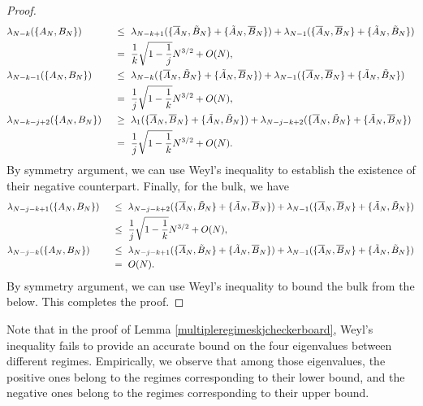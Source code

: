 \documentclass[11pt,reqno]{amsart}
\numberwithin{equation}{section}
\theoremstyle{plain}
\begin{document}
\begin{proof}
\begin{alignat}{2}
&\lambda_{N-k}(\{A_N,B_N\}) &&\ \leq \ \lambda_{N-k+1}(\{\overline{A}_N,\Tilde{B}_N\} + \{\Tilde{A}_N,\overline{B}_N\}) + \lambda_{N-1}(\{\overline{A}_N,\overline{B}_N\}+\{\Tilde{A}_N, \Tilde{B}_N\}) \nonumber \\
& &&\ = \ \frac{1}{k}\sqrt{1-\frac{1}{j}}N^{3/2}+O(N),\nonumber \\
&\lambda_{N-k-1}(\{A_N,B_N\}) &&\ \leq \ \lambda_{N-k}(\{\overline{A}_N,\Tilde{B}_N\} + \{\Tilde{A}_N,\overline{B}_N\}) + \lambda_{N-1}(\{\overline{A}_N,\overline{B}_N\}+\{\Tilde{A}_N, \Tilde{B}_N\}) \nonumber \\
& &&\ = \ \frac{1}{j}\sqrt{1-\frac{1}{k}}N^{3/2}+O(N),\nonumber \\
&\lambda_{N-k-j+2}(\{A_N,B_N\}) &&\ \geq \ \lambda_1(\{\overline{A}_N,\overline{B}_N\}+\{\Tilde{A}_N,\Tilde{B}_N\}) + \lambda_{N-j-k+2}(\{\overline{A}_N,\Tilde{B}_N\} + \{\Tilde{A}_N,\overline{B}_N\}) \nonumber \\
& &&\ = \ \frac{1}{j}\sqrt{1-\frac{1}{k}}N^{3/2} + O(N).
\end{alignat}
By symmetry argument, we can use Weyl's inequality to establish the existence of their negative counterpart. Finally, for the bulk, we have 
\begin{alignat}{2}
&\lambda_{N-j-k+1}(\{A_N,B_N\}) &&\ \leq \ \lambda_{N-j-k+2}(\{\overline{A}_N,\Tilde{B}_N\} + \{\Tilde{A}_N,\overline{B}_N\}) + \lambda_{N-1}(\{\overline{A}_N,\overline{B}_N\}+\{\Tilde{A}_N,\Tilde{B}_N\}) \nonumber \\
& &&\ \leq \ \frac{1}{j}\sqrt{1-\frac{1}{k}}N^{3/2} + O(N),\nonumber \\
&\lambda_{N-j-k}(\{A_N, B_N\}) &&\ \leq \ \lambda_{N-j-k+1}(\{\overline{A}_N, \Tilde{B}_N\}+\{\Tilde{A}_N, \overline{B}_N\})+\lambda_{N-1}(\{\overline{A}_N, \overline{B}_N\}+\{\Tilde{A}_N, \Tilde{B}_N\})\nonumber  \\
& &&\ = \ O(N).
\end{alignat}
By symmetry argument, we can use Weyl's inequality to bound the bulk from the below. This completes the proof.
\end{proof}

Note that in the proof of Lemma \ref{multipleregimeskjcheckerboard}, Weyl's inequality fails to provide an accurate bound on the four eigenvalues between different regimes. Empirically, we observe that among those eigenvalues, the positive ones belong to the regimes corresponding to their lower bound, and the negative ones belong to the regimes corresponding to their upper bound.
\end{document}
